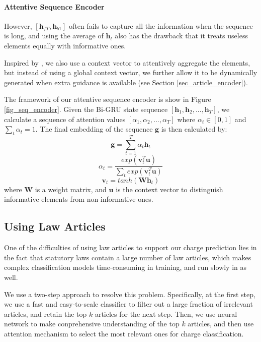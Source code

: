 \paragraph{Attentive Sequence Encoder}
\label{sec_att_seq_encoder}
However, $[\mathbf{h}_{fT}, \mathbf{h}_{b1}]$ often fails to capture all the information when the sequence is long, and using the average of $\mathbf{h}_t$ also has the drawback that it treats useless elements equally with informative ones. 

Inspired by \cite{yang2016hierarchical}, we also use a context vector to attentively aggregate the elements, but instead of using a global context vector, we further allow it to be dynamically generated when extra guidance is available (see Section \ref{sec_article_encoder}).


The framework of our attentive sequence encoder is show in Figure \ref{fig_seq_encoder}. Given the Bi-GRU state sequence $[\mathbf{h}_1, \mathbf{h}_2, ..., \mathbf{h}_T]$, we calculate a sequence of attention values $[\alpha_1, \alpha_2, ..., \alpha_T]$ where $\alpha_t \in [0, 1]$ and $\sum_t{\alpha_t}=1$. The final embedding of the sequence $\mathbf{g}$ is then calculated by:
\begin{equation}
\mathbf{g} = \sum_{t=1}^{T}{\alpha_t \mathbf{h}_t}
\label{seq_embed}
\end{equation}
\begin{equation}
\alpha_t=\frac{exp(\mathbf{v}_t^T \mathbf{u})}{\sum_t{exp(\mathbf{v}_t^T \mathbf{u})}}
\label{gen_att}
\end{equation}
\begin{equation}
\mathbf{v}_t = tanh(\mathbf{W} \mathbf{h}_t)
\label{eq_att_transform}
\end{equation}
where $\mathbf{W}$ is a weight matrix, and $\mathbf{u}$ is the context vector to distinguish informative elements from non-informative ones. 


\subsection{Using Law Articles}
One of the difficulties of using law articles to support our charge prediction lies in the fact that statutory laws contain a large number of law articles, which makes complex classification models time-consuming in training, and run slowly in  as well. 

We use a two-step approach to resolve this problem. Specifically, at the first step, we use a fast and easy-to-scale classifier to filter out a large fraction of irrelevant articles, and retain the top $k$ articles for the next step. Then, we use neural network to make conprehensive understanding of the top $k$ articles, and then use attention mechanism to select the most relevant ones for charge classification.

